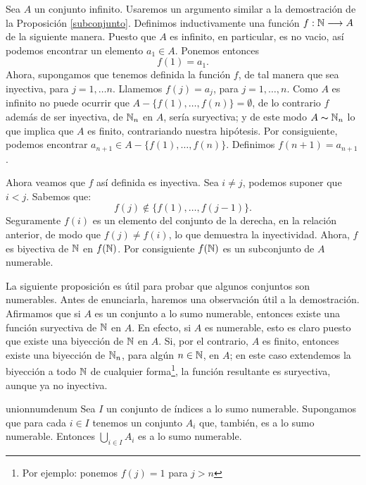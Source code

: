 \begin{demo} Sea $A$ un conjunto infinito. Usaremos un argumento similar a la demostración de
la Proposición \vref{subconjunto}. Definimos inductivamente una
función $f:\mathbb{N}\longrightarrow A$  de la siguiente manera. Puesto
que $A$ es infinito, en particular, es no vacio, así podemos
encontrar un elemento $a_1\in A$. Ponemos entonces
\[f(1)=a_1.\]
Ahora, supongamos que tenemos definida la función $f$, de tal
manera que sea inyectiva, para $j=1,\dots n$. Llamemos $f(j)=a_j$,
para $j=1,\dots , n$. Como $A$ es infinito no puede ocurrir que
$A-\{f(1),\dots,f(n)\}=\emptyset$, de lo contrario $f$ además de
ser inyectiva, de $\mathbb{N}_n$ en $A$, sería suryectiva; y de este
modo $A\thicksim\mathbb{N}_n$ lo que implica que $A$ es finito,
contrariando nuestra hipótesis. Por consiguiente, podemos
encontrar $a_{n+1}\in A-\{f(1),\dots,f(n)\}$. Definimos
$f(n+1)=a_{n+1}$.

Ahora veamos que $f$ así definida es inyectiva. Sea $i\neq
j $, podemos suponer que $i<j$. Sabemos que:
\[f(j)\notin \{f(1),\dots,f(j-1)\}.\]
Seguramente $f(i)$ es un elemento del conjunto de la derecha, en
la relación anterior, de modo que $f(j)\neq f(i)$, lo que
demuestra la inyectividad. Ahora, $f$ es biyectiva de $\mathbb{N}$ en
$f(\mathbb{N})$. Por consiguiente $f(\mathbb{N})$ es un subconjunto de $A$
numerable. 
\end{demo}

La siguiente proposición es útil para probar que algunos
conjuntos son numerables. Antes de enunciarla, haremos una
observación útil a la demostración. Afirmamos que si $A$ es
un conjunto a lo sumo numerable, entonces existe una función
suryectiva de $\mathbb{N}$ en $A$. En efecto, si $A$ es numerable, esto
es claro puesto que existe una biyección de $\mathbb{N}$ en $A$. Si,
por el contrario, $A$ es finito, entonces existe una biyección
de $\mathbb{N}_n$, para algún $n\in\mathbb{N}$, en $A$; en este caso
extendemos la biyección a todo $\mathbb{N}$ de cualquier
forma\footnote{Por ejemplo: ponemos $f(j)=1$ para $j>n$}, la
función resultante es suryectiva, aunque ya no inyectiva.

\begin{proposicion}{unionnumdenum} Sea $I$ un conjunto de índices a lo sumo
numerable. Supongamos que para cada $i\in I$ tenemos un conjunto
$A_i$ que, también, es a lo sumo numerable. Entonces $\bigcup_{i\in I}A_i$
es a lo sumo numerable. 
\end{proposicion}

